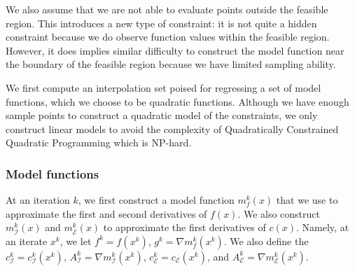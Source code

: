 \documentclass{article}
\let\oldref\ref
\renewcommand{\ref}[1]{(\oldref{#1})}
\begin{document}
\color{blue}
We also assume that we are not able to evaluate points outside the feasible region.
This introduces a new type of constraint: it is not quite a hidden constraint because we do observe function values within the feasible region.
However, it does implies similar difficulty to construct the model function near the boundary of the feasible region because we have limited sampling ability.
\color{black}

We first compute an interpolation set poised for regressing a set of model functions, which we choose to be quadratic functions.
Although we have enough sample points to construct a quadratic model of the constraints, we only construct linear models to avoid the complexity of Quadratically Constrained Quadratic Programming which is NP-hard.

\subsubsection{Model functions}

At an iteration $k$, we first construct a model function $m_f^k(x)$ that we use to approximate the first and second derivatives of $f(x)$.
We also construct $m_{\mathcal{I}}^k(x)$ and $m_{\mathcal{E}}^k(x)$ to approximate the first derivatives of $c(x)$.
Namely, at an iterate $x^k$, we let $f^k = f(x^k)$, $g^k = \nabla m_f^k(x^k)$. %
We also define the $c_{{\mathcal{I}}}^k = c^k_{\mathcal{I}}(x^k)$, 
$A_{{\mathcal{I}}}^k = \nabla m_{\mathcal{I}}^k(x^k)$,
$c_{{\mathcal{E}}}^k = c_{\mathcal{E}}(x^k)$, and
$A_{{\mathcal{E}}}^k = \nabla m_{\mathcal{E}}^k(x^k)$.

\end{document}
